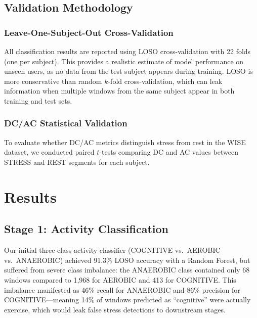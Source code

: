 \documentclass[12pt,letterpaper]{article}
\begin{document}
\subsection{Validation Methodology}

\subsubsection{Leave-One-Subject-Out Cross-Validation}

All classification results are reported using LOSO cross-validation with 22 folds (one per subject). This provides a realistic estimate of model performance on unseen users, as no data from the test subject appears during training. LOSO is more conservative than random $k$-fold cross-validation, which can leak information when multiple windows from the same subject appear in both training and test sets.

\subsubsection{DC/AC Statistical Validation}

To evaluate whether DC/AC metrics distinguish stress from rest in the WISE dataset, we conducted paired $t$-tests comparing DC and AC values between STRESS and REST segments for each subject.



\section{Results}

\subsection{Stage 1: Activity Classification}

Our initial three-class activity classifier (COGNITIVE vs.\ AEROBIC vs.\ ANAEROBIC) achieved 91.3\% LOSO accuracy with a Random Forest, but suffered from severe class imbalance: the ANAEROBIC class contained only 68 windows compared to 1,968 for AEROBIC and 413 for COGNITIVE. This imbalance manifested as 46\% recall for ANAEROBIC and 86\% precision for COGNITIVE---meaning 14\% of windows predicted as ``cognitive'' were actually exercise, which would leak false stress detections to downstream stages.
\end{document}
